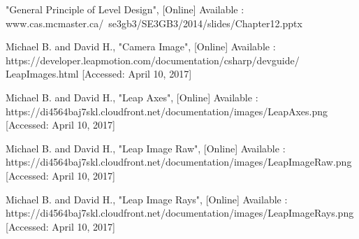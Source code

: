 \documentclass[journal]{IEEEtran}										    %
\begin{document}
\begin{thebibliography}{1}
                "General Principle of Level Design", [Online] Available :
                www.cas.mcmaster.ca/~se3gb3/SE3GB3/2014/slides/Chapter12.pptx
            
                Michael B. and David H., "Camera Image", [Online] Available : 
                https://developer.leapmotion.com/documentation/csharp/devguide/ \\
                Leap\textunderscore Images.html 
                [Accessed: April 10, 2017]
             
                Michael B. and David H., "Leap Axes", [Online] Available : 
                https://di4564baj7skl.cloudfront.net/documentation/images/Leap\textunderscore Axes.png
                [Accessed: April 10, 2017]
                
                Michael B. and David H., "Leap Image Raw", [Online] Available : 
                https://di4564baj7skl.cloudfront.net/documentation/images/Leap\textunderscore Image\textunderscore Raw.png
                [Accessed: April 10, 2017]
                
                Michael B. and David H., "Leap Image Rays", [Online] Available : 
                https://di4564baj7skl.cloudfront.net/documentation/images/Leap\textunderscore Image\textunderscore Rays.png 
                [Accessed: April 10, 2017]
	

        \end{thebibliography}
\end{document}
